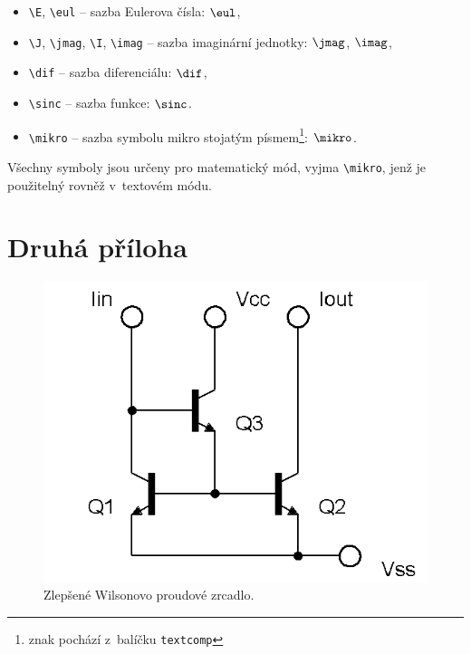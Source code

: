 \begin{itemize}
  \item
    \verb|\E|, \verb|\eul| -- sazba Eulerova čísla: $\eul$,
  \item
    \verb|\J|, \verb|\jmag|, \verb|\I|, \verb|\imag| -- sazba imaginární jednotky: $\jmag$, $\imag$,
  \item
    \verb|\dif| -- sazba diferenciálu: $\dif$,
  \item
    \verb|\sinc| -- sazba funkce: $\sinc$.
  \item
    \verb|\mikro| -- sazba symbolu mikro stojatým písmem\footnote{znak pochází z~balíčku \texttt{textcomp}}: $\mikro$.

\end{itemize}
%
Všechny symboly jsou určeny pro matematický mód, vyjma \verb|\mikro|, jenž je\\ použitelný rovněž v~textovém módu.






\chapter{Druhá příloha}

\begin{figure}[!h]
  \begin{center}
    \includegraphics[scale=0.5]{obrazky/ZlepseneWilsonovoZrcadloNPN}
  \end{center}
  \caption{Zlepšené Wilsonovo proudové zrcadlo.}
\end{figure}

